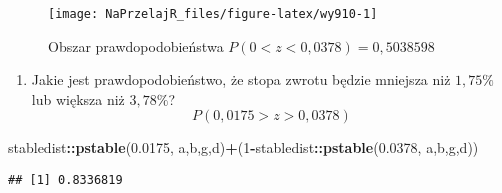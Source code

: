 \documentclass[polish,]{book}
\newenvironment{Shaded}{\begin{snugshade}}{\end{snugshade}}
\newcommand{\DecValTok}[1]{\textcolor[rgb]{0.00,0.00,0.81}{#1}}
\newcommand{\FloatTok}[1]{\textcolor[rgb]{0.00,0.00,0.81}{#1}}
\newcommand{\KeywordTok}[1]{\textcolor[rgb]{0.13,0.29,0.53}{\textbf{#1}}}
\newcommand{\NormalTok}[1]{#1}
\newcommand{\OperatorTok}[1]{\textcolor[rgb]{0.81,0.36,0.00}{\textbf{#1}}}
\providecommand{\tightlist}{%
  \setlength{\itemsep}{0pt}\setlength{\parskip}{0pt}}
\begin{document}
\begin{figure}[h]

{\centering \texttt{[image: NaPrzelajR\_files/figure-latex/wy910-1]} 

}

\caption{Obszar prawdopodobieństwa $P(0<z<0,0378)=0,5038598$}\label{fig:wy910}
\end{figure}

\begin{enumerate}
\def\labelenumi{\arabic{enumi}.}
\setcounter{enumi}{3}
\tightlist
\item
  Jakie jest prawdopodobieństwo, że stopa zwrotu będzie mniejsza niż \(1,75\%\) lub
  większa niż \(3,78\%\)?
  \[P (0,0175 > z > 0,0378)\]
\end{enumerate}

\begin{Shaded}
\begin{Highlighting}[]
\NormalTok{stabledist}\OperatorTok{::}\KeywordTok{pstable}\NormalTok{(}\FloatTok{0.0175}\NormalTok{, a,b,g,d)}\OperatorTok{+}\NormalTok{(}\DecValTok{1}\OperatorTok{-}\NormalTok{stabledist}\OperatorTok{::}\KeywordTok{pstable}\NormalTok{(}\FloatTok{0.0378}\NormalTok{, a,b,g,d))}
\end{Highlighting}
\end{Shaded}

\begin{verbatim}
## [1] 0.8336819
\end{verbatim}
\end{document}
